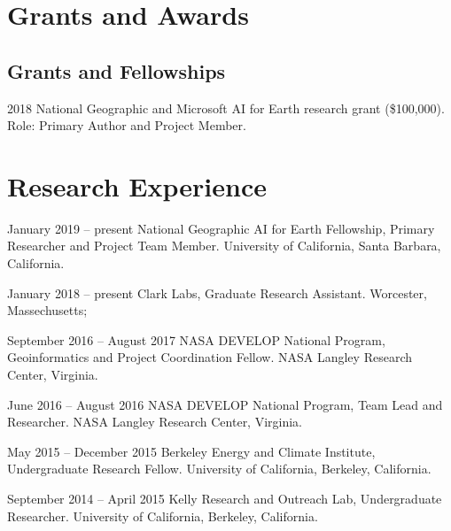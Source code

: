 \documentclass[12pt,letterpaper]{report}
\begin{document}
	
	
	\section*{Grants and Awards}
	
	\subsection*{Grants and Fellowships}
	
	\begin{tablist}
		
		\item[2018] \tab National Geographic and Microsoft AI for Earth research grant (\$100,000). Role: Primary Author and Project Member.
		
	\end{tablist}
	

        \section*{Research Experience}

        \begin{tablist}

                \item[January 2019 -- present] \tab National Geographic AI for Earth Fellowship, Primary Researcher and Project Team Member. University of California, Santa Barbara, California.

                \item[January 2018 -- present] \tab Clark Labs, Graduate Research Assistant. Worcester, Massechusetts; 

                \item[September 2016 -- August 2017] \tab NASA DEVELOP National Program, Geoinformatics and Project Coordination Fellow. NASA Langley Research Center, Virginia.

                \item[June 2016 -- August 2016] \tab NASA DEVELOP National Program, Team Lead and Researcher. NASA Langley Research Center, Virginia.

                \item[May 2015 -- December 2015] \tab Berkeley Energy and Climate Institute, Undergraduate Research Fellow. University of California, Berkeley, California.

                \item[September 2014 -- April 2015] \tab Kelly Research and Outreach Lab, Undergraduate Researcher. University of California, Berkeley, California.

        \end{tablist}
\end{document}
